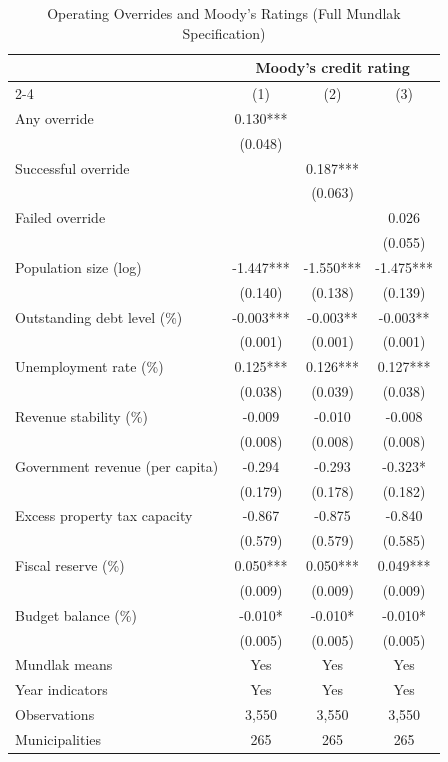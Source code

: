 \begin{table}[!htbp]
\centering
\caption{Operating Overrides and Moody's Ratings (Full Mundlak Specification)}
\label{tab:post_northeast_mundlak_rating_t}
\small
\begin{tabular}{lccc}
\toprule
 & \multicolumn{3}{c}{Moody's credit rating} \\
\cmidrule(lr){2-4}
 & (1) & (2) & (3) \\
\midrule
Any override & 0.130*** &  &  \\
 & (0.048) &  &  \\
Successful override &  & 0.187*** &  \\
 &  & (0.063) &  \\
Failed override &  &  & 0.026 \\
 &  &  & (0.055) \\
\midrule
Population size (log) & -1.447*** & -1.550*** & -1.475*** \\
 & (0.140) & (0.138) & (0.139) \\
Outstanding debt level (\%) & -0.003*** & -0.003** & -0.003** \\
 & (0.001) & (0.001) & (0.001) \\
Unemployment rate (\%) & 0.125*** & 0.126*** & 0.127*** \\
 & (0.038) & (0.039) & (0.038) \\
Revenue stability (\%) & -0.009 & -0.010 & -0.008 \\
 & (0.008) & (0.008) & (0.008) \\
Government revenue (per capita) & -0.294 & -0.293 & -0.323* \\
 & (0.179) & (0.178) & (0.182) \\
Excess property tax capacity & -0.867 & -0.875 & -0.840 \\
 & (0.579) & (0.579) & (0.585) \\
Fiscal reserve (\%) & 0.050*** & 0.050*** & 0.049*** \\
 & (0.009) & (0.009) & (0.009) \\
Budget balance (\%) & -0.010* & -0.010* & -0.010* \\
 & (0.005) & (0.005) & (0.005) \\
\midrule
Mundlak means & Yes & Yes & Yes \\
Year indicators & Yes & Yes & Yes \\
Observations & 3,550 & 3,550 & 3,550 \\
Municipalities & 265 & 265 & 265 \\
\bottomrule
\end{tabular}

\end{table}
